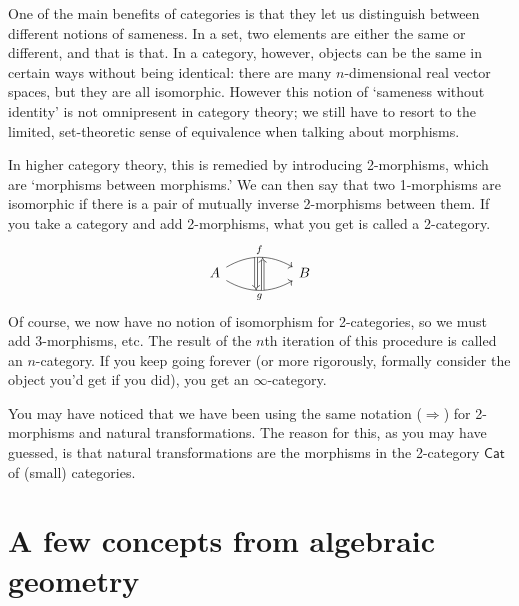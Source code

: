 \documentclass[a4paper]{report}
\theoremstyle{definition}
\theoremstyle{plain}
\theoremstyle{remark}
\begin{document}
One of the main benefits of categories is that they let us distinguish between different notions of sameness. In a set, two elements are either the same or different, and that is that. In a category, however, objects can be the same in certain ways without being identical: there are many $n$-dimensional real vector spaces, but they are all isomorphic. However this notion of `sameness without identity' is not omnipresent in category theory; we still have to resort to the limited, set-theoretic sense of equivalence when talking about morphisms.

In higher category theory, this is remedied by introducing 2-morphisms, which are `morphisms between morphisms.' We can then say that two 1-morphisms are isomorphic if there is a pair of mutually inverse 2-morphisms between them. If you take a category and add 2-morphisms, what you get is called a 2-category.
\begin{equation*}
  \begin{tikzcd}[row sep=huge, column sep=huge]
    A 
    \arrow[r, bend left, "f", ""{name=UL, anchor=south east}, ""{name=UR, anchor=south west}]
    \arrow[r, swap, bend right, "g", ""{name=DL, anchor=north east}, ""{name=DR, anchor=north west}]
    \arrow[Rightarrow, from=UL , to=DL,] 
    \arrow[Leftarrow, from=UR , to=DR,] 
    & B
  \end{tikzcd}
\end{equation*}
Of course, we now have no notion of isomorphism for 2-categories, so we must add 3-morphisms, etc. The result of the $n$th iteration of this procedure is called an $n$-category. If you keep going forever (or more rigorously, formally consider the object you'd get if you did), you get an $\infty$-category.

You may have noticed that we have been using the same notation ($\Rightarrow$) for 2-morphisms and natural transformations. The reason for this, as you may have guessed, is that natural transformations are the morphisms in the 2-category $\mathsf{Cat}$ of (small) categories.

\chapter{A few concepts from algebraic geometry}
\end{document}
